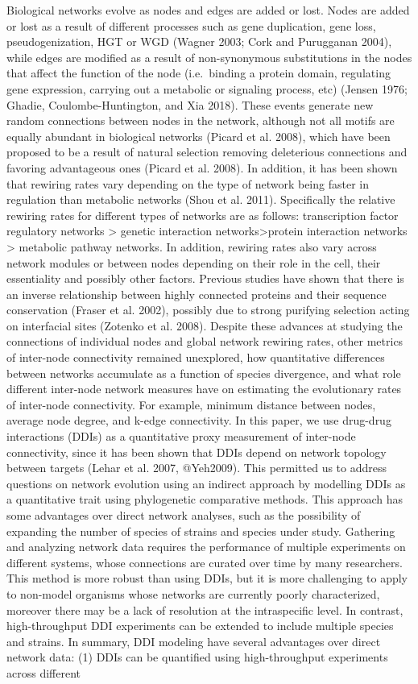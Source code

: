 \documentclass[]{elsarticle} %
\begin{document}
Biological networks evolve as nodes and edges are added or lost. Nodes are added or lost as a result of different processes such as gene duplication, gene loss, pseudogenization, HGT or WGD (Wagner 2003; Cork and Purugganan 2004), while edges are modified as a result of non-synonymous substitutions in the nodes that affect the function of the node (i.e.~binding a protein domain, regulating gene expression, carrying out a metabolic or signaling process, etc) (Jensen 1976; Ghadie, Coulombe-Huntington, and Xia 2018). These events generate new random connections between nodes in the network, although not all motifs are equally abundant in biological networks (Picard et al. 2008), which have been proposed to be a result of natural selection removing deleterious connections and favoring advantageous ones (Picard et al. 2008). In addition, it has been shown that rewiring rates vary depending on the type of network being faster in regulation than metabolic networks (Shou et al. 2011). Specifically the relative rewiring rates for different types of networks are as follows: transcription factor regulatory networks \textgreater{} genetic interaction networks\textgreater protein interaction networks \textgreater{} metabolic pathway networks. In addition, rewiring rates also vary across network modules or between nodes depending on their role in the cell, their essentiality and possibly other factors. Previous studies have shown that there is an inverse relationship between highly connected proteins and their sequence conservation (Fraser et al. 2002), possibly due to strong purifying selection acting on interfacial sites (Zotenko et al. 2008). Despite these advances at studying the connections of individual nodes and global network rewiring rates, other metrics of inter-node connectivity remained unexplored, how quantitative differences between networks accumulate as a function of species divergence, and what role different inter-node network measures have on estimating the evolutionary rates of inter-node connectivity. For example, minimum distance between nodes, average node degree, and k-edge connectivity. In this paper, we use drug-drug interactions (DDIs) as a quantitative proxy measurement of inter-node connectivity, since it has been shown that DDIs depend on network topology between targets (Lehar et al. 2007, @Yeh2009). This permitted us to address questions on network evolution using an indirect approach by modelling DDIs as a quantitative trait using phylogenetic comparative methods. This approach has some advantages over direct network analyses, such as the possibility of expanding the number of species of strains and species under study. Gathering and analyzing network data requires the performance of multiple experiments on different systems, whose connections are curated over time by many researchers. This method is more robust than using DDIs, but it is more challenging to apply to non-model organisms whose networks are currently poorly characterized, moreover there may be a lack of resolution at the intraspecific level. In contrast, high-throughput DDI experiments can be extended to include multiple species and strains. In summary, DDI modeling have several advantages over direct network data: (1) DDIs can be quantified using high-throughput experiments across different 
\end{document}
